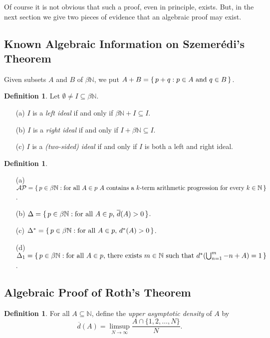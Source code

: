\documentclass[12pt]{article}
\theoremstyle{plain}
\theoremstyle{definition}
\newtheorem{defn}[thm]{Definition}
\newcommand{\bbN}{\mathbb{N}}
\begin{document}
Of course it is not obvious that such a proof, even in principle,
exists.
But, in the next section we give two pieces of evidence that an
algebraic proof may exist. 

\subsection{Known Algebraic Information on  Szemer\'{e}di's Theorem}
Given subsets $A$ and $B$ of $\beta\bbN$, we put $A+B = \{\, p + q : p
\in A \hbox{ and } q \in B \,\}$.
  \begin{defn}
    Let $\emptyset \ne I \subseteq \beta\bbN$.
      \begin{itemize}
        \item[(a)] $I$ is a \textsl{left ideal} if and only if
          $\beta\bbN + I \subseteq I$.
        \item[(b)] $I$ is a \textsl{right ideal} if and only if
          $I+\beta\bbN \subseteq I$.
        \item[(c)] $I$ is a \textsl{(two-sided) ideal} if and only if
          $I$ is both a left and right ideal.
      \end{itemize}
  \end{defn}

  \begin{defn}
    \begin{itemize}
      \item[(a)] $\mathcal{AP} = \{\, p \in \beta\bbN : \hbox{for all
          $A \in p$ $A$ contains a $k$-term arithmetic progression
          for every $k \in \bbN$} \,\}$.
      \item[(b)] $\Delta = \{\, p \in \beta\bbN : \hbox{for all $A \in
          p$, $\overline{d}(A) > 0$} \,\}$.
      \item[(c)] $\Delta^* = \{\, p \in \beta\bbN : \hbox{for all $A
          \in p$, $d^*(A) > 0$} \,\}$.
      \item[(d)] $\Delta_1 = \{\, p \in \beta\bbN : \hbox{for all $A
            \in p$, there exists $m \in \bbN$ such that
            $d^*(\bigcup_{n=1}^m -n+A) = 1$} \,\}$.
    \end{itemize}
  \end{defn}


\subsection{Algebraic Proof of Roth's Theorem}

  \begin{defn}
    For all $A \subseteq \bbN$, define the \textsl{upper asymptotic
      density} of $A$ by 
      \[
        \overline{d}(A) = \limsup_{N\to\infty} \frac{A \cap \{1, 2,
          \ldots, N\}}{N}.
      \]
  \end{defn}
\end{document}

